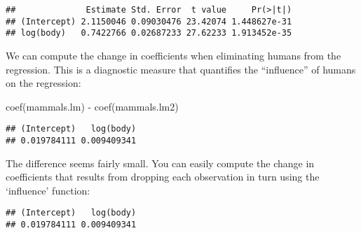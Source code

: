 \documentclass[
]{article}
\newenvironment{Shaded}{\begin{snugshade}}{\end{snugshade}}
\newcommand{\CommentTok}[1]{\textcolor[rgb]{0.56,0.35,0.01}{\textit{#1}}}
\newcommand{\FunctionTok}[1]{\textcolor[rgb]{0.00,0.00,0.00}{#1}}
\newcommand{\NormalTok}[1]{#1}
\newcommand{\OtherTok}[1]{\textcolor[rgb]{0.56,0.35,0.01}{#1}}
\newcommand{\SpecialCharTok}[1]{\textcolor[rgb]{0.00,0.00,0.00}{#1}}
\newcommand{\StringTok}[1]{\textcolor[rgb]{0.31,0.60,0.02}{#1}}
\begin{document}
\begin{Shaded}
\end{Shaded}

\begin{verbatim}
##              Estimate Std. Error  t value     Pr(>|t|)
## (Intercept) 2.1150046 0.09030476 23.42074 1.448627e-31
## log(body)   0.7422766 0.02687233 27.62233 1.913452e-35
\end{verbatim}

We can compute the change in coefficients when eliminating humans from
the regression. This is a diagnostic measure that quantifies the
``influence'' of humans on the regression:

\begin{Shaded}
\begin{Highlighting}[]
\FunctionTok{coef}\NormalTok{(mammals.lm) }\SpecialCharTok{{-}} \FunctionTok{coef}\NormalTok{(mammals.lm2)}
\end{Highlighting}
\end{Shaded}

\begin{verbatim}
## (Intercept)   log(body) 
## 0.019784111 0.009409341
\end{verbatim}

The difference seems fairly small. You can easily compute the change in
coefficients that results from dropping each observation in turn using
the `influence' function:

\begin{Shaded}
\end{Shaded}

\begin{verbatim}
## (Intercept)   log(body) 
## 0.019784111 0.009409341
\end{verbatim}

\begin{Shaded}
\end{Shaded}
\end{document}
